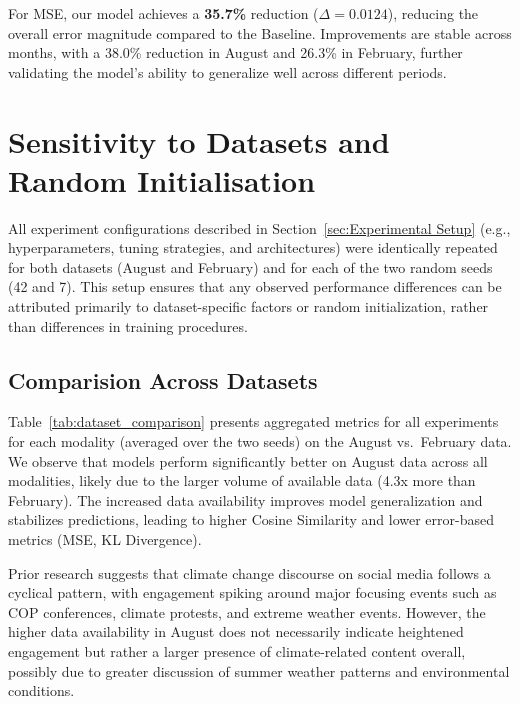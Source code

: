 For MSE, our model achieves a \textbf{35.7\%} reduction ($\Delta = 0.0124$), reducing the overall error magnitude compared to the Baseline. Improvements are stable across months, with a 38.0\% reduction in August and 26.3\% in February, further validating the model’s ability to generalize well across different periods.


\section{Sensitivity to Datasets and Random Initialisation}
\label{sec:dataset_seed_variations}

All experiment configurations described in Section~\ref{sec:Experimental Setup} (e.g., hyperparameters, tuning strategies, and architectures) were identically repeated for both datasets (August and February) and for each of the two random seeds (42 and 7). 
This setup ensures that any observed performance differences can be attributed primarily to dataset-specific factors or random initialization, rather than differences in training procedures.

\subsection{Comparision Across Datasets}
\label{subsec:results_datasets} 

Table~\ref{tab:dataset_comparison} presents aggregated metrics for all experiments for each modality (averaged over the two seeds) on the August vs.\ February data. We observe that models perform significantly better on August data across all modalities, likely due to the larger volume of available data (4.3x more than February). The increased data availability improves model generalization and stabilizes predictions, leading to higher Cosine Similarity and lower error-based metrics (MSE, KL Divergence).
\newline

Prior research suggests that climate change discourse on social media follows a cyclical pattern, with engagement spiking around major focusing events such as COP conferences, climate protests, and extreme weather events. However, the higher data availability in August does not necessarily indicate heightened engagement but rather a larger presence of climate-related content overall, possibly due to greater discussion of summer weather patterns and environmental conditions. \citet{mooseder_social_2023}

